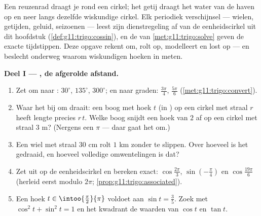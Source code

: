 \begin{problem}
\label{pb:g11:trigo:1}
Een reuzenrad draagt je rond een cirkel; het getij draagt het water van de
haven op en neer langs dezelfde wiskundige cirkel. Elk periodiek
verschijnsel --- wielen, getijden, geluid, seizoenen --- leest zijn
dienstregeling af van de eenheidscirkel uit dit hoofdstuk
(\cref{def:g11:trigo:cossin}), en de  van
\cref{met:g11:trigo:solve} geven de exacte tijdstippen. Deze opgave rekent
om, rolt op, modelleert en lost op --- en beslecht onderweg waarom
wiskundigen hoeken in  meten.

\medskip
\noindent\textbf{Deel I --- , de afgerolde afstand.}
\begin{enumerate}
  \item Zet om naar : $30^\circ$, $135^\circ$, $300^\circ$; en naar
        graden: $\frac{3\pi}{4}$, $\frac{5\pi}{6}$
        (\cref{met:g11:trigo:convert}).
  \item Waar het bij  om draait: een boog met hoek $t$ (in )
        op een cirkel met straal $r$ heeft lengte precies $r\,t$. Welke boog
        snijdt een hoek van $2$  af op een cirkel met straal $3$ m?
        (Nergens een $\pi$ --- daar gaat het om.)
  \item Een wiel met straal $30$ cm rolt $1$ km zonder te slippen. Over
        hoeveel \emph{} is het gedraaid, en hoeveel volledige
        omwentelingen is dat?
  \item Zet uit op de eenheidscirkel en bereken exact:
        $\cos\frac{2\pi}{3}$, $\sin\left(-\frac{\pi}{4}\right)$ en
        $\cos\frac{19\pi}{6}$ (herleid eerst modulo $2\pi$;
        \cref{prop:g11:trigo:associated}).
  \item Een hoek $t \in \intoo{\frac\pi2}{\pi}$ voldoet aan
        $\sin t = \frac35$. Zoek met $\cos^2 t + \sin^2 t = 1$ en het
        kwadrant de waarden van $\cos t$ en $\tan t$.
\end{enumerate}


\end{problem}
